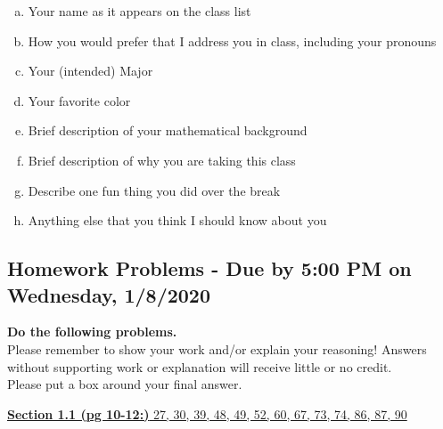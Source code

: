 \documentclass[10pt]{article}
\begin{document}
\begin{enumerate}[a)]
\item Your name as it appears on the class list 
\item How you would prefer that I address you in class, including your pronouns
\item Your (intended) Major
\item Your favorite color
\item Brief description of your mathematical background
\item Brief description of why you are taking this class
\item Describe one fun thing you did over the break
\item Anything else that you think I should know about you
\end{enumerate}




\subsection*{Homework Problems - Due by 5:00 PM on Wednesday, 1/8/2020}



\noindent\textbf{Do the following problems.}%
 \\ Please remember to show your work and/or explain your reasoning!  Answers without supporting work or explanation will receive little or no credit.\\ Please put a box around your final answer.
 

\vspace{.1in}

\underline{ \textbf{Section 1.1 (pg 10-12:)} 27, 30, 39, 48, 49, 52, 60, 67, 73, 74, 86, 87, 90}

\vspace{.1in}
\end{document}
